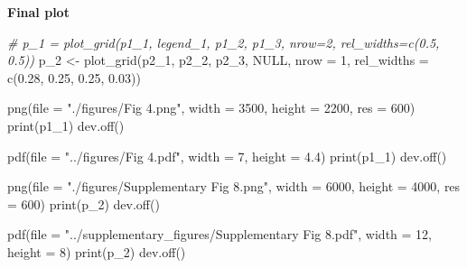 \documentclass[
  11pt,
  oneside]{book}
\newenvironment{Shaded}{\begin{snugshade}}{\end{snugshade}}
\newcommand{\AttributeTok}[1]{\textcolor[rgb]{0.77,0.63,0.00}{#1}}
\newcommand{\CommentTok}[1]{\textcolor[rgb]{0.56,0.35,0.01}{\textit{#1}}}
\newcommand{\ConstantTok}[1]{\textcolor[rgb]{0.00,0.00,0.00}{#1}}
\newcommand{\DecValTok}[1]{\textcolor[rgb]{0.00,0.00,0.81}{#1}}
\newcommand{\FloatTok}[1]{\textcolor[rgb]{0.00,0.00,0.81}{#1}}
\newcommand{\FunctionTok}[1]{\textcolor[rgb]{0.00,0.00,0.00}{#1}}
\newcommand{\NormalTok}[1]{#1}
\newcommand{\OtherTok}[1]{\textcolor[rgb]{0.56,0.35,0.01}{#1}}
\newcommand{\StringTok}[1]{\textcolor[rgb]{0.31,0.60,0.02}{#1}}
\begin{document}
\textbf{Final plot}

\begin{Shaded}
\begin{Highlighting}[]
\CommentTok{\# p\_1 = plot\_grid(p1\_1, legend\_1, p1\_2, p1\_3, nrow=2, rel\_widths=c(0.5, 0.5))}
\NormalTok{p\_2 }\OtherTok{\textless{}{-}} \FunctionTok{plot\_grid}\NormalTok{(p2\_1, p2\_2, p2\_3, }\ConstantTok{NULL}\NormalTok{, }\AttributeTok{nrow =} \DecValTok{1}\NormalTok{, }\AttributeTok{rel\_widths =} \FunctionTok{c}\NormalTok{(}\FloatTok{0.28}\NormalTok{, }\FloatTok{0.25}\NormalTok{, }\FloatTok{0.25}\NormalTok{, }\FloatTok{0.03}\NormalTok{))}
\end{Highlighting}
\end{Shaded}

\begin{Shaded}
\begin{Highlighting}[]
\FunctionTok{png}\NormalTok{(}\AttributeTok{file =} \StringTok{"./figures/Fig 4.png"}\NormalTok{, }\AttributeTok{width =} \DecValTok{3500}\NormalTok{, }\AttributeTok{height =} \DecValTok{2200}\NormalTok{, }\AttributeTok{res =} \DecValTok{600}\NormalTok{)}
\FunctionTok{print}\NormalTok{(p1\_1)}
\FunctionTok{dev.off}\NormalTok{()}

\FunctionTok{pdf}\NormalTok{(}\AttributeTok{file =} \StringTok{"../figures/Fig 4.pdf"}\NormalTok{, }\AttributeTok{width =} \DecValTok{7}\NormalTok{, }\AttributeTok{height =} \FloatTok{4.4}\NormalTok{)}
\FunctionTok{print}\NormalTok{(p1\_1)}
\FunctionTok{dev.off}\NormalTok{()}

\FunctionTok{png}\NormalTok{(}\AttributeTok{file =} \StringTok{"./figures/Supplementary Fig 8.png"}\NormalTok{, }\AttributeTok{width =} \DecValTok{6000}\NormalTok{, }\AttributeTok{height =} \DecValTok{4000}\NormalTok{, }\AttributeTok{res =} \DecValTok{600}\NormalTok{)}
\FunctionTok{print}\NormalTok{(p\_2)}
\FunctionTok{dev.off}\NormalTok{()}

\FunctionTok{pdf}\NormalTok{(}\AttributeTok{file =} \StringTok{"../supplementary\_figures/Supplementary Fig 8.pdf"}\NormalTok{, }\AttributeTok{width =} \DecValTok{12}\NormalTok{, }\AttributeTok{height =} \DecValTok{8}\NormalTok{)}
\FunctionTok{print}\NormalTok{(p\_2)}
\FunctionTok{dev.off}\NormalTok{()}
\end{Highlighting}
\end{Shaded}
\end{document}
